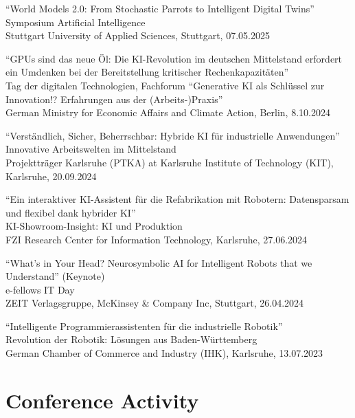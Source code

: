 \documentclass[11pt]{article} %
\begin{document}

``World Models 2.0: From Stochastic Parrots to Intelligent Digital Twins''\\
Symposium Artificial Intelligence\\
Stuttgart University of Applied Sciences, Stuttgart, 07.05.2025

\medskip


``GPUs sind das neue Öl: Die KI-Revolution im deutschen Mittelstand erfordert ein Umdenken bei der Bereitstellung kritischer Rechenkapazitäten''\\
Tag der digitalen Technologien, Fachforum ``Generative KI als Schlüssel zur Innovation!? Erfahrungen aus der (Arbeits-)Praxis''\\
German Ministry for Economic Affairs and Climate Action, Berlin, 8.10.2024

\medskip

``Verständlich, Sicher, Beherrschbar: Hybride KI für industrielle Anwendungen''\\
Innovative Arbeitswelten im Mittelstand\\
Projektträger Karlsruhe (PTKA) at Karlsruhe Institute of Technology (KIT), Karlsruhe, 20.09.2024

\medskip

``Ein interaktiver KI-Assistent für die Refabrikation mit Robotern: Datensparsam und flexibel dank hybrider KI''\\
KI-Showroom-Insight: KI und Produktion\\
FZI Research Center for Information Technology, Karlsruhe, 27.06.2024

\medskip

``What's in Your Head? Neurosymbolic AI for Intelligent Robots that we Understand'' (Keynote)\\
e-fellows IT Day\\
ZEIT Verlagsgruppe, McKinsey \& Company Inc, Stuttgart, 26.04.2024

\medskip

``Intelligente Programmierassistenten für die industrielle Robotik''\\
Revolution der Robotik: Lösungen aus Baden-Württemberg\\
German Chamber of Commerce and Industry (IHK), Karlsruhe, 13.07.2023

\section*{Conference Activity}
\end{document}
